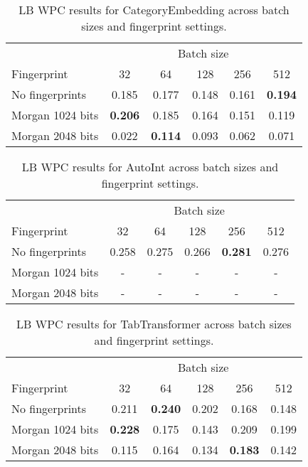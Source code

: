 \documentclass{article}
\begin{document}
\begin{table}[h!]
\centering
\caption{LB WPC results for CategoryEmbedding across batch sizes and fingerprint settings.}
\label{tab:lbwpc_categoryembedding}
\begin{tabular}{lccccc}
\toprule
& \multicolumn{5}{c}{Batch size} \\
\cmidrule(lr){2-6}
Fingerprint & 32 & 64 & 128 & 256 & 512 \\
\midrule
No fingerprints & 0.185 & 0.177 & 0.148 & 0.161 & \textbf{0.194} \\
Morgan 1024 bits & \textbf{0.206} & 0.185 & 0.164 & 0.151 & 0.119 \\
Morgan 2048 bits & 0.022 & \textbf{0.114} & 0.093 & 0.062 & 0.071 \\
\bottomrule
\end{tabular}
\end{table}

\begin{table}[h!]
\centering
\caption{LB WPC results for AutoInt across batch sizes and fingerprint settings.}
\label{tab:lbwpc_autoint}
\begin{tabular}{lccccc}
\toprule
& \multicolumn{5}{c}{Batch size} \\
\cmidrule(lr){2-6}
Fingerprint & 32 & 64 & 128 & 256 & 512 \\
\midrule
No fingerprints & 0.258 & 0.275 & 0.266 & \textbf{0.281} & 0.276 \\
Morgan 1024 bits & - & - & - & - & - \\
Morgan 2048 bits & - & - & - & - & - \\
\bottomrule
\end{tabular}
\end{table}

\begin{table}[h!]
\centering
\caption{LB WPC results for TabTransformer across batch sizes and fingerprint settings.}
\label{tab:lbwpc_tabtransformer}
\begin{tabular}{lccccc}
\toprule
& \multicolumn{5}{c}{Batch size} \\
\cmidrule(lr){2-6}
Fingerprint & 32 & 64 & 128 & 256 & 512 \\
\midrule
No fingerprints & 0.211 & \textbf{0.240} & 0.202 & 0.168 & 0.148 \\
Morgan 1024 bits & \textbf{0.228} & 0.175 & 0.143 & 0.209 & 0.199 \\
Morgan 2048 bits & 0.115 & 0.164 & 0.134 & \textbf{0.183} & 0.142 \\
\bottomrule
\end{tabular}
\end{table}
\end{document}

